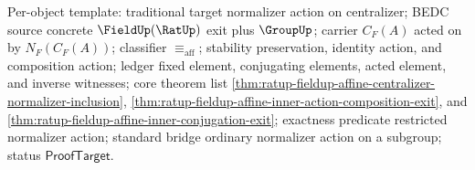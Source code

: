 Per-object template: traditional target normalizer action on centralizer; BEDC
source concrete $\FieldUp(\RatUp)$ exit plus $\GroupUp$; carrier $C_F(A)$ acted
on by $N_F(C_F(A))$; classifier $\equiv_{\mathrm{aff}}$; stability
preservation, identity action, and composition action; ledger fixed element,
conjugating elements, acted element, and inverse witnesses; core theorem list
\autoref{thm:ratup-fieldup-affine-centralizer-normalizer-inclusion},
\autoref{thm:ratup-fieldup-affine-inner-action-composition-exit}, and
\autoref{thm:ratup-fieldup-affine-inner-conjugation-exit}; exactness predicate
restricted normalizer action; standard bridge ordinary normalizer action on a
subgroup; status $\mathsf{ProofTarget}$.




